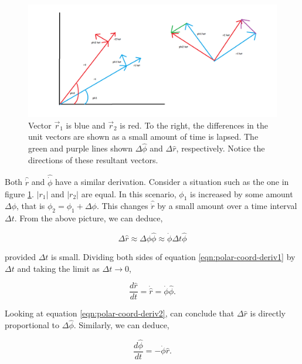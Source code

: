 \documentclass{article}
\begin{document}
\begin{figure}[h]
    \centering
    \includegraphics[width=13.0cm]{Misc/3.1/spherical-derive.png}
    \caption{Vector $\vec{r}_1$ is blue and $\vec{r}_2$ is red. To the right, the differences in the unit vectors are shown as a small amount of time is lapsed. The green and purple lines shown $\Delta \hat \phi$ and $\Delta \hat r$, respectively. Notice the directions of these resultant vectors.}
    \label{fig:spherical-coord-deriv}
\end{figure}

Both $\hat \dot r$ and $\hat \dot \phi$ have a similar derivation. Consider a situation such as the one in figure \ref{fig:spherical-coord-deriv}. $|r_1|$ and $|r_2|$ are equal. In this scenario, $\phi_1$ is increased by some amount $\Delta \phi$, that is $\phi_2 = \phi_1 + \Delta \phi$. This changes $\hat \dot r$ by a small amount over a time interval $\Delta t$. From the above picture, we can deduce,

\begin{equation}
    \label{eqn:polar-coord-deriv1}
    \Delta \hat r \approx \Delta \phi \hat \phi \approx \dot \phi \Delta t \hat \phi
\end{equation}

\noindent provided $\Delta t$ is small. Dividing both sides of equation \ref{eqn:polar-coord-deriv1} by $\Delta t$ and taking the limit as $\Delta t \rightarrow 0$,

\begin{equation}
    \label{eqn:polar-coord-deriv2}
    \frac{d \hat r}{dt} = \dot \hat r = \dot \phi \hat \phi.
\end{equation}

Looking at equation \ref{eqn:polar-coord-deriv2}, can conclude that $\Delta \hat r$ is directly proportional to $\Delta \hat \phi$. Similarly, we can deduce, 

\begin{equation}
    \label{eqn:polar-coord-deriv3}
    \frac{d \hat \phi}{dt} = - \dot \phi \hat r.
\end{equation}
\end{document}

